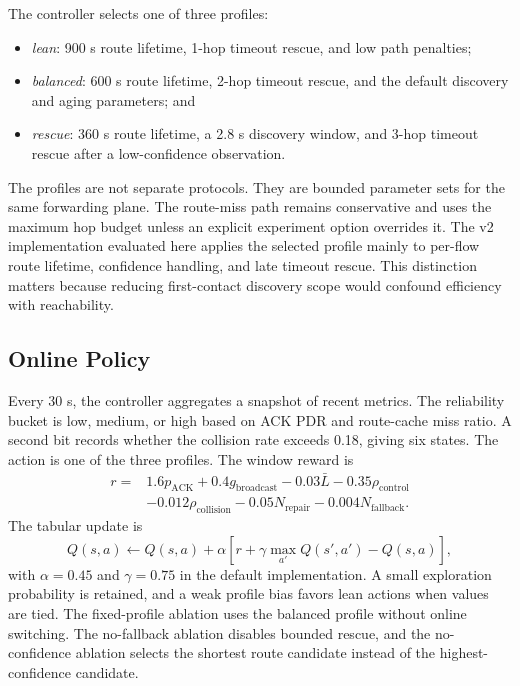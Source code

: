\documentclass[10pt,conference,letterpaper]{IEEEtran}
\begin{document}
The controller selects one of three profiles:
\begin{itemize}
\item \emph{lean}: 900 s route lifetime, 1-hop timeout rescue, and low path
penalties;
\item \emph{balanced}: 600 s route lifetime, 2-hop timeout rescue, and the
default discovery and aging parameters; and
\item \emph{rescue}: 360 s route lifetime, a 2.8 s discovery window, and
3-hop timeout rescue after a low-confidence observation.
\end{itemize}
The profiles are not separate protocols. They are bounded parameter sets for
the same forwarding plane. The route-miss path remains conservative and uses
the maximum hop budget unless an explicit experiment option overrides it. The
v2 implementation evaluated here applies the selected profile mainly to
per-flow route lifetime, confidence handling, and late timeout rescue. This
distinction matters because reducing first-contact discovery scope would
confound efficiency with reachability.


\subsection{Online Policy}

Every 30 s, the controller aggregates a snapshot of recent metrics. The
reliability bucket is low, medium, or high based on ACK PDR and route-cache
miss ratio. A second bit records whether the collision rate exceeds 0.18,
giving six states. The action is one of the three profiles. The window reward
is
\begin{align}
 r ={}&1.6p_{\mathrm{ACK}} + 0.4g_{\mathrm{broadcast}}
 -0.03\bar{L} -0.35\rho_{\mathrm{control}} \nonumber\\
 &-0.012\rho_{\mathrm{collision}} -0.05N_{\mathrm{repair}}
 -0.004N_{\mathrm{fallback}} .
\end{align}
The tabular update is
\begin{equation}
 Q(s,a) \leftarrow Q(s,a) + \alpha
 [r+\gamma\max_{a'}Q(s',a')-Q(s,a)],
\end{equation}
with $\alpha=0.45$ and $\gamma=0.75$ in the default implementation. A small
exploration probability is retained, and a weak profile bias favors lean
actions when values are tied. The fixed-profile ablation uses the balanced
profile without online switching. The no-fallback ablation disables bounded
rescue, and the no-confidence ablation selects the shortest route candidate
instead of the highest-confidence candidate.
\end{document}
